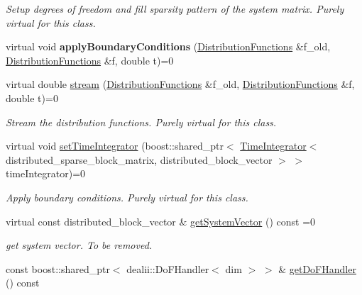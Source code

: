 \begin{DoxyCompactItemize}
\begin{DoxyCompactList}\small\item\em Setup degrees of freedom and fill sparsity pattern of the system matrix. Purely virtual for this class. \item\end{DoxyCompactList}\item 
\hypertarget{classnatrium_1_1AdvectionOperator_a5444b3cde21a9b638d963e36d2f3ad88}{
virtual void {\bfseries applyBoundaryConditions} (\hyperlink{classnatrium_1_1DistributionFunctions}{DistributionFunctions} \&f\_\-old, \hyperlink{classnatrium_1_1DistributionFunctions}{DistributionFunctions} \&f, double t)=0}
\label{classnatrium_1_1AdvectionOperator_a5444b3cde21a9b638d963e36d2f3ad88}

\item 
virtual double \hyperlink{classnatrium_1_1AdvectionOperator_abccc060e37071fa776cd6e9fc6cc7987}{stream} (\hyperlink{classnatrium_1_1DistributionFunctions}{DistributionFunctions} \&f\_\-old, \hyperlink{classnatrium_1_1DistributionFunctions}{DistributionFunctions} \&f, double t)=0
\begin{DoxyCompactList}\small\item\em Stream the distribution functions. Purely virtual for this class. \item\end{DoxyCompactList}\item 
virtual void \hyperlink{classnatrium_1_1AdvectionOperator_aa93f60c7e7270a35df21387a962d7a38}{setTimeIntegrator} (boost::shared\_\-ptr$<$ \hyperlink{classnatrium_1_1TimeIntegrator}{TimeIntegrator}$<$ distributed\_\-sparse\_\-block\_\-matrix, distributed\_\-block\_\-vector $>$ $>$ timeIntegrator)=0
\begin{DoxyCompactList}\small\item\em Apply boundary conditions. Purely virtual for this class. \item\end{DoxyCompactList}\item 
\hypertarget{classnatrium_1_1AdvectionOperator_aa1eb5cd5a2c1b6b3b8f6395bac67ef55}{
virtual const distributed\_\-block\_\-vector \& \hyperlink{classnatrium_1_1AdvectionOperator_aa1eb5cd5a2c1b6b3b8f6395bac67ef55}{getSystemVector} () const =0}
\label{classnatrium_1_1AdvectionOperator_aa1eb5cd5a2c1b6b3b8f6395bac67ef55}

\begin{DoxyCompactList}\small\item\em get system vector. To be removed. \item\end{DoxyCompactList}\item 
\hypertarget{classnatrium_1_1AdvectionOperator_acf891e95e63f22a5f9c8f09d56bdafba}{
const boost::shared\_\-ptr$<$ dealii::DoFHandler$<$ dim $>$ $>$ \& \hyperlink{classnatrium_1_1AdvectionOperator_acf891e95e63f22a5f9c8f09d56bdafba}{getDoFHandler} () const }
\label{classnatrium_1_1AdvectionOperator_acf891e95e63f22a5f9c8f09d56bdafba}


\end{DoxyCompactItemize}
